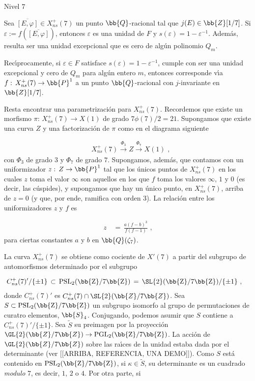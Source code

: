 \begin{subsection}{Nivel $7$}
\begin{lemaUnoKenku}
Sea $\overline{[E,\varphi]}\in X_{ns}^{+}(7)$ un punto $\bb{Q}$-racional
tal que $j(E)\in\bb{Z}[1/7]$. Si $\varepsilon:=f(\overline{[E,\varphi]})$,
entonces $\varepsilon$ es una unidad de $F$ y
$s(\varepsilon)=1-\varepsilon^{-1}$. Adem\'{a}s, resulta ser una
unidad excepcional que es cero de alg\'{u}n polinomio $Q_{m}$.

Rec\'{\i}procamente, si $\varepsilon\in F$ satisface
$s(\varepsilon)=1-\varepsilon^{-1}$, cumple con ser una unidad excepcional
y cero de $Q_{m}$ para alg\'{u}n entero $m$, entonces corresponde v\'{\i}a
$f:\,X_{ns}^{+}(7)\rightarrow\bb{P}^{1}$ a un punto $\bb{Q}$-racional con
$j$-invariante en $\bb{Z}[1/7]$.

\end{lemaUnoKenku}

Resta encontrar una parametrizaci\'{o}n para $X_{ns}^{+}(7)$.
Recordemos que existe un morfismo $\pi:\,X_{ns}^{+}(7)\rightarrow X(1)$
de grado $7\phi(7)/2=21$. Supongamos que existe una curva $Z$ y una
factorizaci\'{o}n de $\pi$ como en el diagrama siguiente

\begin{align*}
& X_{ns}^{+}(7)\xrightarrow{\Phi_{3}}
Z\xrightarrow{\Phi_{7}} X(1)\text{ ,}
\end{align*}
con $\Phi_{3}$ de grado $3$ y $\Phi_{7}$ de grado $7$. Supongamos,
adem\'{a}s, que contamos con un uniformizador $z:\,Z\rightarrow\bb{P}^{1}$
tal que los \'{u}nicos puntos de $X_{ns}^{+}(7)$ en los cuales $z$ toma el
valor $\infty$ son aquellos en los que $f$ toma los valores $\infty$, $1$
y $0$ (es decir, las c\'{u}spides), y supongamos que hay un \'{u}nico
punto, en $X_{ns}^{+}(7)$, arriba de $z=0$ (y que, por ende, ramifica con
orden $3$). La relaci\'{o}n entre los uniformizadores $z$ y $f$ es

\begin{align*}
z &\,=\,\frac{a(f-b)^{3}}{f(f-1)}\text{ ,}
\end{align*}
para ciertas constantes $a$ y $b$ en $\bb{Q}(\zeta_{7})$.

La curva $X_{ns}^{+}(7)$ se obtiene como cociente de $X'(7)$ a partir del
subgrupo de automorfismos determinado por el subgrupo

\begin{align*}
C_{ns}^{+}(7)'/\{\pm 1\} & \,\subset\,\rm{PSL}_{2}(\bb{Z}/7\bb{Z})
\,=\,\SL{2}(\bb{Z}/7\bb{Z})/\{\pm 1\}
\text{ ,}
\end{align*}
donde $C_{ns}^{+}(7)'$ es $C_{ns}^{+}(7)\cap\SL{2}(\bb{Z}/7\bb{Z})$.
Sea $S\subset\rm{PSL}_{2}(\bb{Z}/7\bb{Z})$ un subgrupo isomorfo al
grupo de permutaciones de curatro elementos, $\bb{S}_{4}$.
Conjugando, podemos asumir que $S$ contiene a $C_{ns}^{+}(7)'/\{\pm 1\}$.
Sea $\widetilde{S}$ su preimagen por la proyecci\'{o}n
$\GL{2}(\bb{Z}/7\bb{Z})\rightarrow\rm{PGL}_{2}(\bb{Z}/7\bb{Z})$.
La acci\'{o}n de $\GL{2}(\bb{Z}/7\bb{Z})$ sobre las ra\'{\i}ces de la unidad
estaba dada por el determinante (ver [[ARRIBA, REFERENCIA, UNA DEMO]]).
Como $S$ est\'{a} contenido en $\rm{PSL}_{2}(\bb{Z}/7\bb{Z})$, si
$\kappa\in\widetilde{S}$, su determinante es un cuadrado \textit{modulo}
$7$, es decir, $1$, $2$ o $4$. Por otra parte, si


\end{subsection}
